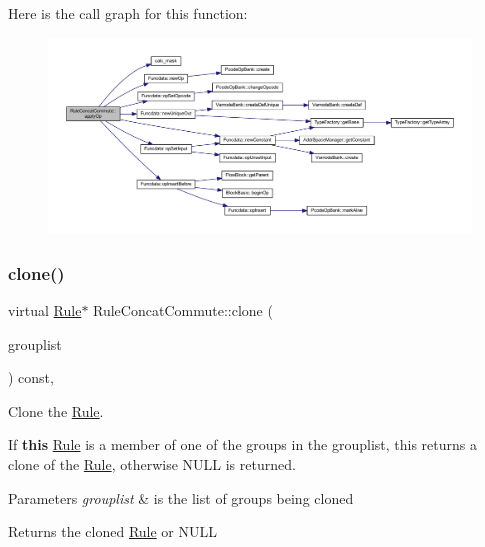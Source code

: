 Here is the call graph for this function\+:
\nopagebreak
\begin{figure}[H]
\begin{center}
\leavevmode
\includegraphics[width=350pt]{class_rule_concat_commute_a75dbdeccddc5baf27b6390449b331bcf_cgraph}
\end{center}
\end{figure}
\mbox{\label{class_rule_concat_commute_ac1f7bc3a2249397cd9a5d2a1cfb8b0db}} 
\subsubsection{\texorpdfstring{clone()}{clone()}}
{\footnotesize\ttfamily virtual \mbox{\hyperlink{class_rule}{Rule}}$\ast$ Rule\+Concat\+Commute\+::clone (\begin{DoxyParamCaption}\item[{const \mbox{\hyperlink{class_action_group_list}{Action\+Group\+List}} \&}]{grouplist }\end{DoxyParamCaption}) const\hspace{0.3cm}{\ttfamily [inline]}, {\ttfamily [virtual]}}



Clone the \mbox{\hyperlink{class_rule}{Rule}}. 

If {\bfseries{this}} \mbox{\hyperlink{class_rule}{Rule}} is a member of one of the groups in the grouplist, this returns a clone of the \mbox{\hyperlink{class_rule}{Rule}}, otherwise N\+U\+LL is returned. 
\begin{DoxyParams}{Parameters}
{\em grouplist} & is the list of groups being cloned \\
\hline
\end{DoxyParams}
\begin{DoxyReturn}{Returns}
the cloned \mbox{\hyperlink{class_rule}{Rule}} or N\+U\+LL 
\end{DoxyReturn}


